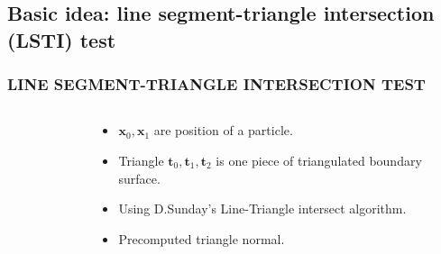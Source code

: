 \documentclass{beamer}
\begin{document}
\subsection{Basic idea: line segment-triangle intersection (LSTI) test}
\begin{frame}
\frametitle{LINE SEGMENT-TRIANGLE INTERSECTION TEST}
\begin{columns}
\begin{column}[t]{5.5cm}
\begin{figure}[H]
\begin{center}


\end{center}
\end{figure}
\pause
\end{column}
\begin{column}[t]{5cm}
\begin{itemize}

\item  $\mathbf{x}_0,\mathbf{x}_1$ are position of a particle.

\pause

\item Triangle $\mathbf{t}_0,\mathbf{t}_1,\mathbf{t}_2$ is one piece of triangulated boundary surface.

\pause

\item Using D.Sunday's\cite{LT} Line-Triangle intersect algorithm.
\pause
\item Precomputed triangle normal.
\end{itemize}
\end{column}
\end{columns}
\end{frame}
\end{document}
